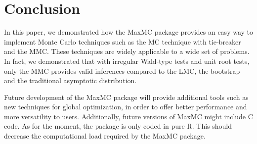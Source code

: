 \documentclass[]{article}\usepackage[]{graphicx}\usepackage[]{color}
\newcommand{\pkg}[1]{{\normalfont\fontseries{b}\selectfont #1}}
\let\proglang=\textsf
\begin{document}
\section{Conclusion}

In this paper, we demonstrated how the \pkg{MaxMC} package provides an easy way to implement Monte Carlo techniques such as the MC technique with tie-breaker and the MMC. These techniques are widely applicable to a wide set of problems. In fact, we demonstrated that with irregular Wald-type tests and unit root tests, only the MMC provides valid inferences compared to the LMC, the bootstrap and the traditional asymptotic distribution.

Future development of the \pkg{MaxMC} package will provide additional tools such as new techniques for global optimization, in order to offer better performance and more versatility to users. Additionally, future versions of \pkg{MaxMC} might include \proglang{C} code. As for the moment, the package is only coded in pure \proglang{R}. This should decrease the computational load required by the \pkg{MaxMC} package.


\clearpage

\printbibliography
\end{document}
